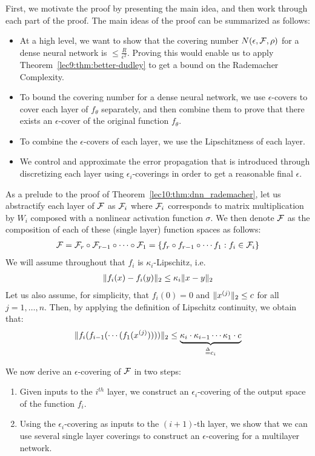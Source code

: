 First, we motivate the proof by presenting the main idea, and then work through each part of the proof. The main ideas of the proof can be summarized as follows:

\begin{itemize}
	\item At a high level, we want to show that the covering number $N(\epsilon, \mathcal F, \rho)$ for a dense neural network is $\leq \frac{R}{\epsilon^2}$. Proving this would enable us to apply Theorem~\ref{lec9:thm:better-dudley} to get a bound on the Rademacher Complexity.
	\item To bound the covering number for a dense neural network, we use $\epsilon$-covers to cover each layer of $f_\theta$ separately, and then combine them to prove that there exists an $\epsilon$-cover of the original function $f_\theta$. 
	\item To combine the $\epsilon$-covers of each layer, we use the Lipschitzness of each layer.
	\item We control and approximate the error propagation that is introduced through discretizing each layer using $\epsilon_i$-coverings in order to get a reasonable final $\epsilon$.
\end{itemize}

As a prelude to the proof of Theorem~\ref{lec10:thm:dnn_rademacher}, let us abstractify each layer of $\mathcal F$ as $\mathcal F_i$ where $\mathcal F_i$ corresponds to matrix multiplication by $W_i$ composed with a nonlinear activation function $\sigma$. We then denote $\mathcal F$ as the composition of each of these (single layer) function spaces as follows:
\begin{align}
\mathcal F = \mathcal F_r \circ \mathcal F_{r - 1} \circ \cdots \circ \mathcal F_1 = \{f_r \circ f_{r - 1} \circ \cdots f_{1} : f_i \in \mathcal F_i\}
\end{align}
We will assume throughout that $f_i$ is $\kappa_i$-Lipschitz, i.e.
\begin{align}
\|f_i(x) - f_i(y)\|_2 \leq \kappa_i \|x - y\|_2 \label{lec10:eqn:lipschitz-def}
\end{align} 
Let us also assume, for simplicity, that $f_i(0) = 0$ and $\|x^{(j)}\|_2 \leq c$ for all $j = 1,\dots,n$. Then, by applying the definition of Lipschitz continuity, we obtain that:
\begin{align}
\norm{f_i(f_{i - 1}(\cdots(f_1(x\sp{j}))))}_2 \leq \underbrace{\kappa_{i} \cdot \kappa_{i - 1} \cdots \kappa_1 \cdot c}_{\defeq c_i}
\end{align}

We now derive an $\epsilon$-covering of $\mathcal F$ in two steps:
\begin{enumerate}
	\item Given inputs to the $i^{th}$ layer, we construct an $\epsilon_i$-covering of the output space of the function $f_i$.
	\item Using the $\epsilon_i$-covering as inputs to the $(i + 1)$-th layer, we show that we can use several single layer coverings to construct an $\epsilon$-covering for a multilayer network.
\end{enumerate}

